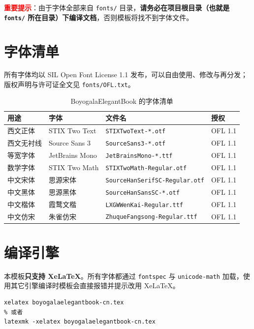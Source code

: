 \documentclass[lang=cn,10pt,scheme=chinese]{boyogalaelegantbook}
\begin{document}
\textcolor{red}{\bfseries 重要提示}：由于字体全部来自 \lstinline{fonts/} 目录，\textbf{请务必在项目根目录（也就是 \lstinline{fonts/} 所在目录）下编译文档}，否则模板将找不到字体文件。

\section{字体清单}

所有字体均以 SIL Open Font License 1.1 发布，可以自由使用、修改与再分发；版权声明与许可证全文见 \lstinline{fonts/OFL.txt}。

\begin{table}[htbp]
  \centering
  \caption{BoyogalaElegantBook 的字体清单}
  \begin{tabular}{llll}
  \toprule
  用途 & 字体 & 文件名 & 授权 \\
  \midrule
  西文正体 & STIX Two Text & \lstinline|STIXTwoText-*.otf| & OFL 1.1 \\
  西文无衬线 & Source Sans 3 & \lstinline|SourceSans3-*.otf| & OFL 1.1 \\
  等宽字体 & JetBrains Mono & \lstinline|JetBrainsMono-*.ttf| & OFL 1.1 \\
  数学字体 & STIX Two Math & \lstinline|STIXTwoMath-Regular.otf| & OFL 1.1 \\
  中文宋体 & 思源宋体 & \lstinline|SourceHanSerifSC-Regular.otf| & OFL 1.1 \\
  中文黑体 & 思源黑体 & \lstinline|SourceHanSansSC-*.otf| & OFL 1.1 \\
  中文楷体 & 霞鹜文楷 & \lstinline|LXGWWenKai-Regular.ttf| & OFL 1.1 \\
  中文仿宋 & 朱雀仿宋 & \lstinline|ZhuqueFangsong-Regular.ttf| & OFL 1.1 \\
  \bottomrule
  \end{tabular}
\end{table}

\section{编译引擎}

本模板\textbf{只支持 XeLaTeX}。所有字体都通过 \lstinline{fontspec} 与 \lstinline{unicode-math} 加载，使用其它引擎编译时模板会直接报错并提示改用 XeLaTeX。

\begin{lstlisting}
xelatex boyogalaelegantbook-cn.tex
% 或者
latexmk -xelatex boyogalaelegantbook-cn.tex
\end{lstlisting}
\end{document}
